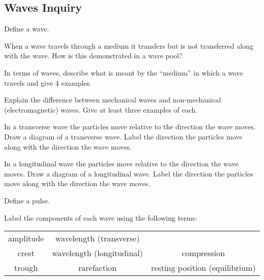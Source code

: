 \documentclass[]{exam}
\begin{document}
\subsection*{Waves Inquiry}

\begin{questions}
\question 
Define a wave.

\fillwithlines{8mm}

\question 
When a wave travels through a medium it transfers \fillin[energy ] but \fillin[matter ] is not transferred along with the wave. How is this demonstrated in a wave pool?

\fillwithlines{2cm}


\question 
In terms of waves, describe what is meant by the ``medium'' in which a wave travels and give 4 examples.

\question 
Explain the difference between mechanical waves and non-mechanical (electromagnetic) waves. Give at least three examples of each.

\fillwithlines{2cm}

\question 
In a transverse wave the particles move \fillin[perpendicular ] relative to the direction the wave moves. Draw a diagram of a transverse wave. Label the direction the particles move along with the direction the wave moves.                 


\question 
In a longitudinal wave the particles move \fillin[parallel ] relative to the direction the wave moves. Draw a diagram of a longitudinal wave. Label the direction the particles move along with the direction the wave moves.                      


\question 
Define a pulse.

\fillwithlines{1.5cm}

\question
Label the components of each wave using the following terms:

\begin{center}
\begin{tabular}{ccc}
     amplitude & wavelength (transverse) &  \\
     crest & wavelength (longitudinal) & compression \\
     trough & rarefaction & resting position (equilibrium)
\end{tabular}
\end{center}



\end{questions}
\end{document}

